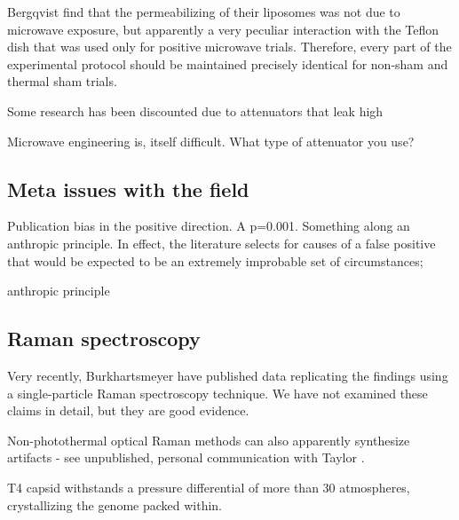 \documentclass[paper.tex]{subfiles}
\begin{document}
Bergqvist \cite{Effect1994a} find that the permeabilizing of their liposomes was not due to microwave exposure, but apparently a very peculiar interaction with the Teflon dish that was used only for positive microwave trials. Therefore, every part of the experimental protocol should be maintained precisely identical for non-sham and thermal sham trials.

Some research has been discounted due to attenuators that leak high 


Microwave engineering is, itself  difficult. What type of attenuator you use?



\subsection{Meta issues with the field}


Publication bias in the positive direction. A p=0.001. Something along an anthropic principle. In effect, the literature selects for causes of a false positive that would be expected to be an extremely improbable set of circumstances; 

anthropic principle


\subsection{Raman spectroscopy}

Very recently, Burkhartsmeyer \cite{Optical2020} have published data replicating the findings using a single-particle Raman spectroscopy technique. We have not examined these claims in detail, but they are good evidence.

Non-photothermal optical Raman methods can also apparently synthesize artifacts - see unpublished, personal communication with Taylor \cite{mechanisms1981}. 






T4 capsid withstands a pressure differential of more than 30 atmospheres, crystallizing the genome packed within.





\cite{Osmotic2003}
\end{document}
